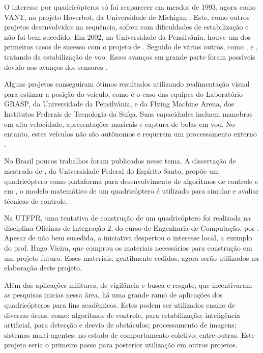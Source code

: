 O interesse por quadricópteros só foi reaparecer em meados de 1993, agora como VANT, no projeto Hoverbot, da Universidade de Michigan \cite{borestein93}. Este, como outros projetos desenvolvidos na sequência, sofreu com dificuldades de estabilização e não foi bem sucedido. Em 2002, na Universidade da Pensilvânia, houve um dos primeiros casos de sucesso com o projeto de . Seguido de vários outros, como \cite{niceCU04}, \cite{starmac04} e \cite{bouabdallah07}, tratando da estabilização de voo. Esses avanços em grande parte foram possíveis devido aos avanços dos sensores .

Alguns projetos conseguiram ótimos resultados utilizando realimentação visual para estimar a posição do veículo, como é o caso das equipes do Laboratório GRASP, da Universidade da Pensilvânia, e da Flying Machine Arena, dos Institutos Federais de Tecnologia da Suíça. Suas capacidades incluem manobras em alta velocidade, apresentações musicais e captura de bolas em voo. No entanto, estes veículos não são autônomos e requerem um processamento externo \cite{Lupashin2010, michael2010}.

No Brasil poucos trabalhos foram publicados nesse tema. A dissertação de mestrado de , da Universidade Federal do Espírito Santo, propõe um quadricóptero como plataforma para desenvolvimento de algoritmos de controle e em , o modelo matemático de um quadricóptero é utilizado para simular e avaliar técnicas de controle.

Na UTFPR, uma tentativa de construção de um quadricóptero foi realizada na disciplina Oficinas de Integração 2, do curso de Engenharia de Computação, por . Apesar de não bem sucedida, a iniciativa despertou o interesse local, a exemplo do prof. Hugo Vieira, que comprou os materiais necessários para construção em um projeto futuro. Esses materiais, gentilmente cedidos, agora serão utilizados na elaboração deste projeto.

Além das aplicações militares, de vigilância e busca e resgate, que incentivaram as pesquisas inicias nessa área, há uma grande ramo de aplicações dos quadricópteros para fins acadêmicos. Estes podem ser utilizados ensino de diversas áreas, como: algoritmos de controle, para estabilização; inteligência artificial, para detecção e desvio de obstáculos; processamento de imagens; sistemas multi-agentes, no estudo de comportamento coletivo; entre outras. Este projeto seria o primeiro passo para posterior utilização em outros projetos.


